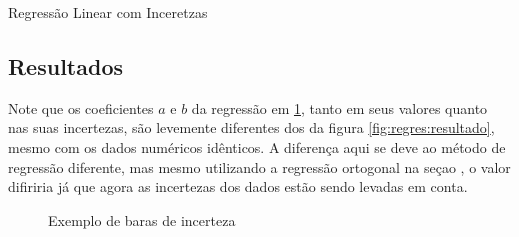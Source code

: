     \begin{listing}[H]
        \caption{Regressão Linear com Inceretzas}
        \label{code:incert:regres}

    \end{listing}


\subsection{Resultados}

    \begin{nota}
        Note que os coeficientes $a$ e $b$ da regressão em \ref{fig:incert:resultado}, tanto em seus valores quanto nas suas incertezas, são levemente diferentes dos da figura \ref{fig:regres:resultado}, mesmo com os dados numéricos idênticos. A diferença aqui se deve ao método de regressão diferente, mas mesmo utilizando a regressão ortogonal na seçao , o valor difiriria já que agora as incertezas dos dados estão sendo levadas em conta.
    \end{nota}

    \begin{figure}[H]
        \centering
        

        \caption{Exemplo de baras de incerteza}
        \label{fig:incert:resultado}
    \end{figure}
